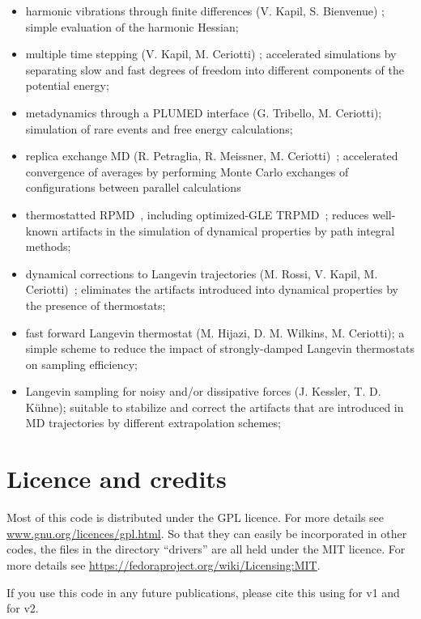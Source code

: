 \documentclass[11pt,english,fleqn]{report}
\begin{document}
\begin{itemize}
\item harmonic vibrations through finite differences (V. Kapil, S. Bienvenue)  \cite{ross+16prl}; {simple evaluation of the harmonic Hessian;}
\item multiple time stepping (V. Kapil, M. Ceriotti) \cite{kapi+16jcp}; {accelerated simulations by separating slow and fast degrees of freedom into different components of the potential energy;}
\item metadynamics through a PLUMED interface (G. Tribello, M. Ceriotti); {simulation of rare events and free energy calculations;}
\item replica exchange MD (R. Petraglia, R. Meissner, M. Ceriotti)~\cite{petr+15jcc}; {accelerated convergence of averages by performing Monte Carlo exchanges of configurations between parallel calculations}
\item thermostatted RPMD~\cite{ross+14jcp}, including optimized-GLE TRPMD~\cite{ross+18jcp}; {reduces well-known artifacts in the simulation of dynamical properties by path integral methods;}
\item dynamical corrections to Langevin trajectories (M. Rossi, V. Kapil, M. Ceriotti)~\cite{ross+18jcp}; {eliminates the artifacts introduced into dynamical properties by the presence of thermostats;}
\item fast forward Langevin thermostat (M. Hijazi, D. M. Wilkins, M. Ceriotti); {a simple scheme to reduce the impact of strongly-damped Langevin thermostats on sampling efficiency;} \cite{hija+18jcp}
\item Langevin sampling for noisy and/or dissipative forces (J. Kessler, T. D. K\"uhne); {suitable to stabilize and correct the artifacts that are introduced in MD trajectories by different extrapolation schemes;}
\end{itemize}


\section{Licence and credits}

Most of this code is distributed under the GPL licence. For more details see
\url{www.gnu.org/licences/gpl.html}. 
So that they can easily be incorporated in other codes, the files
in the directory {}``drivers'' are all held under the MIT licence.
For more details see \url{https://fedoraproject.org/wiki/Licensing:MIT}.

If you use this code in any
future publications, please cite this using \cite{ceri+14cpc} for v1 and \cite{Kapil:2019ju} for v2.
\end{document}
